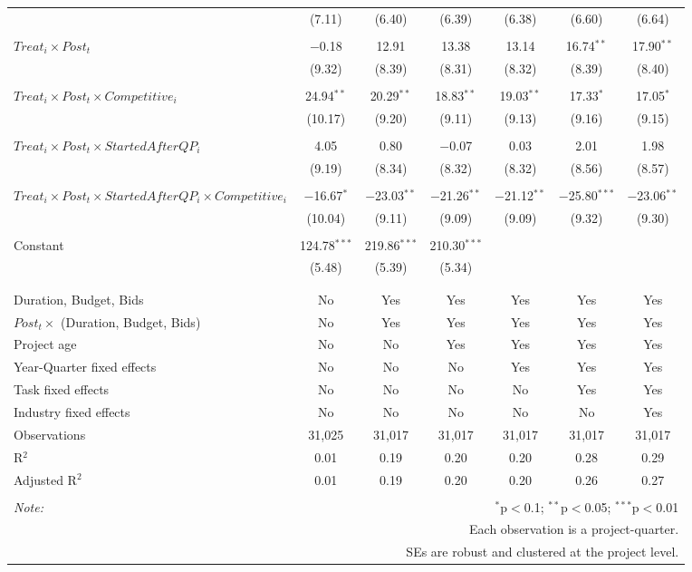 \documentclass[
]{article}
\begin{document}
\begin{table}[H]
\begin{tabular}{@{\extracolsep{-3pt}}lcccccc}
  & (7.11) & (6.40) & (6.39) & (6.38) & (6.60) & (6.64) \\ 
  & & & & & & \\ 
 $Treat_i \times Post_t$ & $-$0.18 & 12.91 & 13.38 & 13.14 & 16.74$^{**}$ & 17.90$^{**}$ \\ 
  & (9.32) & (8.39) & (8.31) & (8.32) & (8.39) & (8.40) \\ 
  & & & & & & \\ 
 $Treat_i \times Post_t \times Competitive_i$ & 24.94$^{**}$ & 20.29$^{**}$ & 18.83$^{**}$ & 19.03$^{**}$ & 17.33$^{*}$ & 17.05$^{*}$ \\ 
  & (10.17) & (9.20) & (9.11) & (9.13) & (9.16) & (9.15) \\ 
  & & & & & & \\ 
 $Treat_i \times Post_t \times StartedAfterQP_i$ & 4.05 & 0.80 & $-$0.07 & 0.03 & 2.01 & 1.98 \\ 
  & (9.19) & (8.34) & (8.32) & (8.32) & (8.56) & (8.57) \\ 
  & & & & & & \\ 
 $Treat_i \times Post_t \times StartedAfterQP_i \times Competitive_i$ & $-$16.67$^{*}$ & $-$23.03$^{**}$ & $-$21.26$^{**}$ & $-$21.12$^{**}$ & $-$25.80$^{***}$ & $-$23.06$^{**}$ \\ 
  & (10.04) & (9.11) & (9.09) & (9.09) & (9.32) & (9.30) \\ 
  & & & & & & \\ 
 Constant & 124.78$^{***}$ & 219.86$^{***}$ & 210.30$^{***}$ &  &  &  \\ 
  & (5.48) & (5.39) & (5.34) &  &  &  \\ 
  & & & & & & \\ 
\hline \\[-1.8ex] 
Duration, Budget, Bids & No & Yes & Yes & Yes & Yes & Yes \\ 
$Post_t \times $  (Duration, Budget, Bids) & No & Yes & Yes & Yes & Yes & Yes \\ 
Project age & No & No & Yes & Yes & Yes & Yes \\ 
Year-Quarter fixed effects & No & No & No & Yes & Yes & Yes \\ 
Task fixed effects & No & No & No & No & Yes & Yes \\ 
Industry fixed effects & No & No & No & No & No & Yes \\ 
Observations & 31,025 & 31,017 & 31,017 & 31,017 & 31,017 & 31,017 \\ 
R$^{2}$ & 0.01 & 0.19 & 0.20 & 0.20 & 0.28 & 0.29 \\ 
Adjusted R$^{2}$ & 0.01 & 0.19 & 0.20 & 0.20 & 0.26 & 0.27 \\ 
\hline 
\hline \\[-1.8ex] 
\textit{Note:}  & \multicolumn{6}{r}{$^{*}$p$<$0.1; $^{**}$p$<$0.05; $^{***}$p$<$0.01} \\ 
 & \multicolumn{6}{r}{Each observation is a project-quarter.} \\ 
 & \multicolumn{6}{r}{SEs are robust and clustered at the project level.} \\ 
\end{tabular} 
\end{table}
\end{document}
